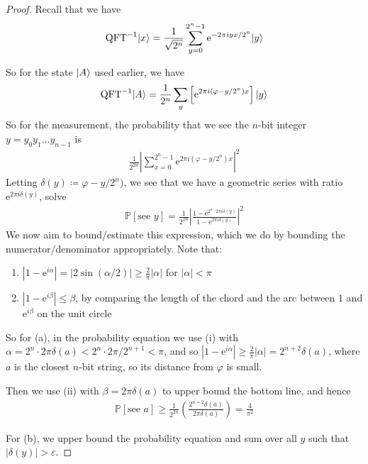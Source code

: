 \documentclass[]{article}
\DeclarePairedDelimiter\ket{\lvert}{\rangle}
\theoremstyle{custhm}
\theoremstyle{cusdef}
\theoremstyle{custhm}
\theoremstyle{custhm}
\theoremstyle{custhm}
\theoremstyle{custhm}
\theoremstyle{cusdef}
\theoremstyle{remark}
\newcommand{\e}{\mathrm{e}}
\newcommand{\eps}{\varepsilon}
\renewcommand{\P}{\mathbb{P}}
\renewcommand{\phi}{\varphi}
\newcommand{\qft}{\textrm{QFT}}
\begin{document}

\begin{proof}
	Recall that we have
	\begin{align*}
		\qft^{-1}\ket{x} = \frac{1}{\sqrt{2^n}} \sum_{y=0}^{2^n-1}\e^{-2\pi i yx/2^n}\ket{y}
	\end{align*}
	
	So for the state $\ket{A}$ used earlier, we have
	\begin{align*}
		\qft^{-1}\ket{A} = \frac{1}{2^n} \sum_{y}\left[ \e^{2\pi i (\phi - y/2^n)x}\right]\ket{y}
	\end{align*}
	So for the measurement, the probability that we see the $n$-bit integer $y = y_0y_1\dots y_{n-1}$ is
	\begin{align*}
		\frac{1}{2^{2n}}\left|\sum_{x=0}^{2^n-1}\e^{2\pi i (\phi - y/2^n)x}\right|^2
	\end{align*}
	Letting $\delta(y)\coloneqq \phi - y/2^n)$, we see that we have a geometric series with ratio $\e^{2\pi i\delta(y)}$, solve
	\begin{align*}
		\P[\textrm{see }y] = \frac{1}{2^{2n}}\left| \frac{1-\e^{2^n\cdot 2\pi i \delta(y)}}{1 - \e^{2\pi i \delta(y)}} \right|^2
	\end{align*}
	We now aim to bound/estimate this expression, which we do by bounding the numerator/denominator appropriately. Note that:
	\begin{enumerate}[label=(\roman*)]
		\item $|1 - \e^{i\alpha}| = |2\sin(\alpha/2)| \ge \frac{2}{\pi}|\alpha|$ for $|\alpha| < \pi$
		\item $|1 - \e^{i\beta}| \le \beta$, by comparing the length of the chord and the arc between $1$ and $\e^{i\beta}$ on the unit circle
	\end{enumerate}

	So for (a), in the probability equation we use (i) with $\alpha = 2^n\cdot 2\pi \delta(a) < 2^n\cdot 2\pi/2^{n+1} < \pi$, and so $|1 - \e^{i\alpha}| \ge \frac{2}{\pi}|\alpha| = 2^{n+2}\delta(a)$, where $a$ is the closest $n$-bit string, so its distance from $\phi$ is small.

	Then we use (ii) with $\beta = 2\pi\delta(a)$ to upper bound the bottom line, and hence
	\begin{align*}
		\P[\textrm{see }a] \ge \frac{1}{2^{2n}}\left(\frac{2^{n+2}\delta(a)}{2\pi \delta(a)}\right) = \frac{4}{\pi^2}
	\end{align*}

	For (b), we upper bound the probability equation and sum over all $y$ such that $|\delta(y)| > \eps$.


\end{proof}
\end{document}
